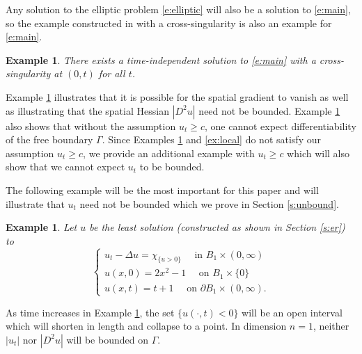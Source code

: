 \documentclass{amsart}
\newtheorem{example}[theorem]{Example}
\numberwithin{equation}{section}
\begin{document}
  Any solution to the elliptic problem \eqref{e:elliptic} will also be a solution to \eqref{e:main}, so the example constructed in \cite{aw06} with a cross-singularity is also an example for \eqref{e:main}. 
  \begin{example} \label{ex:elliptic}
      There exists a time-independent solution to \eqref{e:main} with a cross-singularity at $(0,t)$ for all $t$.  
  \end{example}
  Example \ref{ex:elliptic} illustrates that it is possible for the spatial gradient to vanish as well as illustrating that the spatial Hessian $|D^2 u|$ need not be bounded. Example \ref{ex:elliptic} also shows that without the assumption $u_t \geq c$, one cannot expect differentiability of the free boundary $\Gamma$. Since Examples \ref{ex:elliptic} and \ref{ex:local} do not satisfy our assumption $u_t \geq c$, we provide an additional example with $u_t \geq c$ which will also show that we cannot expect $u_t$ to be bounded. 

  The following example will be the most important for this paper and will illustrate that $u_t$ need not be bounded which we prove in Section \ref{s:unbound}. 
  \begin{example} \label{ex:last}
      Let $u$ be the least solution (constructed as shown in Section \ref{s:er}) to 
      \[
     \begin{cases}
      u_t - \Delta u=\chi_{\{u>0\}} \quad \text{ in } B_1 \times (0,\infty) \\
      u(x,0)=2x^2-1 \quad \text{ on } B_1 \times \{0\} \\
      u(x,t)=t+1 \quad \text{ on } \partial B_1 \times (0,\infty).
      \end{cases}
     \]
  \end{example}
  As time increases in Example \ref{ex:last}, the set $\{u(\cdot,t)<0\}$ will be an open interval which will shorten in length and collapse to a point. In dimension $n=1$, neither $|u_t|$ nor $|D^2 u|$ will be bounded on $\Gamma$. 
\end{document}
